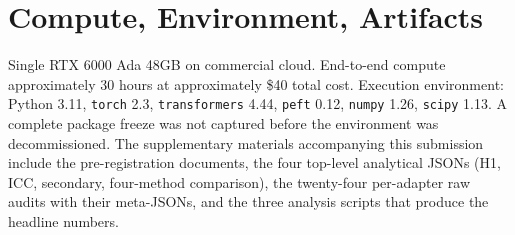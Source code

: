 \documentclass[10pt]{article}
\begin{document}
\section{Compute, Environment, Artifacts}
\label{app:compute}

Single RTX 6000 Ada 48GB on commercial cloud.
End-to-end compute approximately 30 hours at approximately \$40
total cost. Execution environment: Python 3.11, \texttt{torch}
2.3, \texttt{transformers} 4.44, \texttt{peft} 0.12, \texttt{numpy}
1.26, \texttt{scipy} 1.13. A complete package freeze was not
captured before the environment was decommissioned.
The supplementary materials accompanying this submission include
the pre-registration documents, the four top-level analytical JSONs
(H1, ICC, secondary, four-method comparison), the twenty-four
per-adapter raw audits with their meta-JSONs, and the three analysis
scripts that produce the headline numbers.
\end{document}
